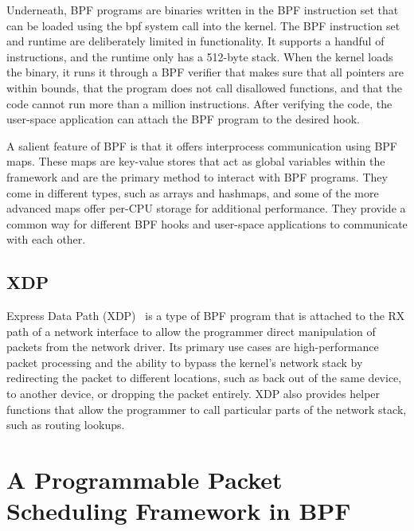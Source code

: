 \documentclass[sigconf, nonacm]{acmart}
\begin{document}
Underneath, BPF programs are binaries written in the BPF instruction set that can be loaded using the bpf system call into the kernel. The BPF instruction set and runtime are deliberately limited in functionality. It supports a handful of instructions, and the runtime only has a 512-byte stack. When the kernel loads the binary, it runs it through a BPF verifier that makes sure that all pointers are within bounds, that the program does not call disallowed functions, and that the code cannot run more than a million instructions. After verifying the code, the user-space application can attach the BPF program to the desired hook.

A salient feature of BPF is that it offers interprocess communication using BPF maps. These maps are key-value stores that act as global variables within the framework and are the primary method to interact with BPF programs. They come in different types, such as arrays and hashmaps, and some of the more advanced maps offer per-CPU storage for additional performance. They provide a common way for different BPF hooks and user-space applications to communicate with each other.


\subsection{XDP} \label{sec:xdp}

Express Data Path (XDP)~\cite{hoiland2018express} is a type of BPF program that is attached to the RX path of a network interface to allow the programmer direct manipulation of packets from the network driver. Its primary use cases are high-performance packet processing and the ability to bypass the kernel's network stack by redirecting the packet to different locations, such as back out of the same device, to another device, or dropping the packet entirely. XDP also provides helper functions that allow the programmer to call particular parts of the network stack, such as routing lookups.

\section{A Programmable Packet Scheduling Framework in BPF}
\end{document}
